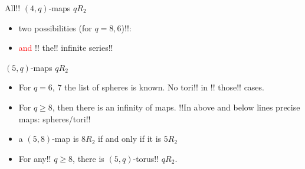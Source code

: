 \documentclass[%
pdf,
colorBG,
slideColor,
]{prosper}
\begin{document}
\begin{slide}{All!! $(4,q)$-maps $qR_2$}
\begin{itemize}
\item two possibilities (for $q=8,6$)!!:

\begin{center}
\begin{minipage}{3cm}
\centering
{}\par
\end{minipage}
\begin{minipage}{3cm}
\centering
{}\par
\end{minipage}
\end{center}
\item \textcolor{red}{and} 
!!%
the!! infinite series!!\\[1mm]
\begin{center}
\begin{minipage}{2.6cm}
\centering
{}\par
\end{minipage}
\begin{minipage}{2.6cm}
\centering
{}\par
\end{minipage}
\begin{minipage}{2.6cm}
\centering
{}\par
\end{minipage}
\begin{minipage}{2.6cm}
\centering
{}\par
\end{minipage}
\end{center}
\end{itemize}

\end{slide}




\begin{slide}{$(5,q)$-maps $qR_2$}
\begin{itemize}
\item For $q=6$, $7$ the list of spheres is known. No tori!! in 
!!%
those!! cases.
\item For $q\geq 8$, then there is an infinity of maps.
!!In above and below lines precise maps: spheres/tori!!
\item a $(5,8)$-map is $8R_2$ if and only if it is $5R_2$
\item For any!! $q\geq 8$, there is $(5,q)$-torus!! $qR_2$.

\end{itemize}
\end{slide}
\end{document}
